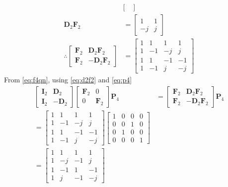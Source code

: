 \documentclass[journal,12pt,twocolumn]{IEEEtran}
\let\vec\mathbf
\numberwithin{equation}{section}
\renewcommand\thesection{\arabic{section}}
\begin{document}
\begin{enumerate}[label=\arabic*.,ref=\thesection.\theenumi]
\begin{align}
\begin{bmatrix}
\end{bmatrix}
\end{align}
\begin{align}
\vec{D}_{2}\vec{F}_{2}&=
\begin{bmatrix}
1&1\\-j&j
\end{bmatrix}\\
\therefore
\begin{bmatrix}
\vec{F}_{2} & \vec{D}_{2}\vec{F}_{2} \\
\vec{F}_{2} & -\vec{D}_{2}\vec{F}_{2}
\end{bmatrix}&=
\begin{bmatrix}
1&1&1&1\\1&-1&-j&j\\1&1&-1&-1\\1&-1&j&-j
\end{bmatrix}
\label{eq:d2f2}
\end{align}
From \eqref{eq:f4qn}, using \eqref{eq:d2f2} and \eqref{eq:p4}
\begin{align}
\begin{bmatrix}
	\vec{I}_{2} & \vec{D}_{2} \\
\vec{I}_{2} & -\vec{D}_{2}
\end{bmatrix}
\begin{bmatrix}
\vec{F}_{2} & 0 \\
0 & \vec{F}_{2}
\end{bmatrix}
\vec{P}_{4}&=
\begin{bmatrix}
\vec{F}_{2} & \vec{D}_{2}\vec{F}_{2} \\
\vec{F}_{2} & -\vec{D}_{2}\vec{F}_{2}
\end{bmatrix}\vec{P}_{4}\\
=\begin{bmatrix}
1&1&1&1\\1&-1&-j&j\\1&1&-1&-1\\1&-1&j&-j
\end{bmatrix}\begin{bmatrix}
1&0&0&0\\0&0&1&0\\0&1&0&0\\0&0&0&1
\end{bmatrix}\\
=\begin{bmatrix}
1&1&1&1\\1&-j&-1&j\\1&-1&1&-1\\1&j&-1&-j
\end{bmatrix}

\end{align}
\end{enumerate}
\end{document}
